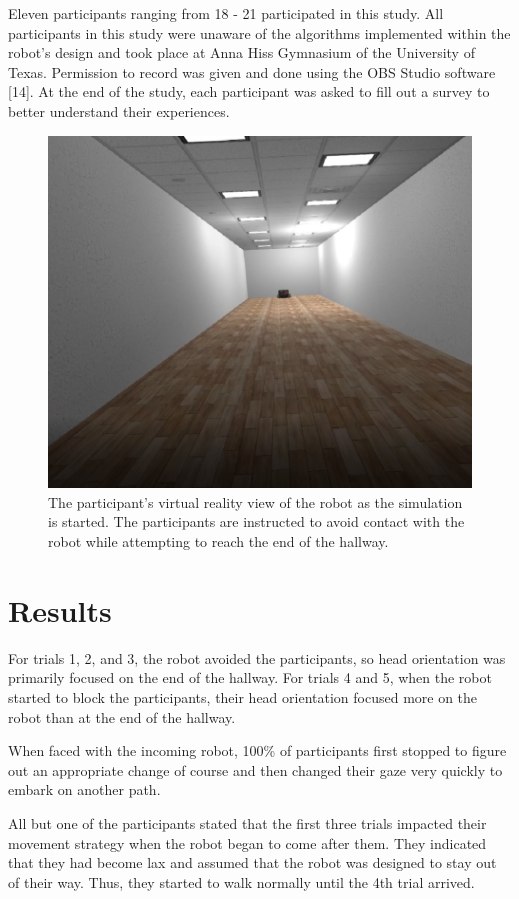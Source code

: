 \documentclass[letterpaper, 10 pt, conference]{ieeeconf}
\begin{document}
    Eleven participants ranging from 18 - 21 participated in this study. All participants in this study were unaware of the algorithms implemented within the robot's design and took place at Anna Hiss Gymnasium of the University of Texas. Permission to record was given and done using the OBS Studio software [14]. At the end of the study, each participant was asked to fill out a survey to better understand their experiences.
\begin{figure}
\centering
\includegraphics[scale=0.35]{VR Perspective.png}
\caption{The participant's virtual reality view of the robot as the simulation is started. The participants are instructed to avoid contact with the robot while attempting to reach the end of the hallway.}
\end{figure}
    
\section{Results}
For trials 1, 2, and 3, the robot avoided the participants, so head orientation was primarily focused on the end of the hallway. For trials 4 and 5, when the robot started to block the participants, their head orientation focused more on the robot than at the end of the hallway. 

When faced with the incoming robot, 100\% of participants first stopped to figure out an appropriate change of course and then changed their gaze very quickly to embark on another path.

All but one of the participants stated that the first three trials impacted their movement strategy when the robot began to come after them. They indicated that they had become lax and assumed that the robot was designed to stay out of their way. Thus, they started to walk normally until the 4th trial arrived.
\end{document}
